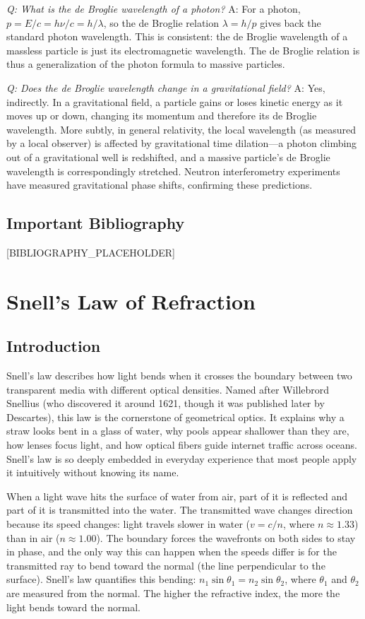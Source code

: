 \documentclass[11pt,openright]{book}
\begin{document}
\textit{Q: What is the de Broglie wavelength of a photon?}
A: For a photon, $p = E/c = h\nu/c = h/\lambda$, so the de Broglie relation $\lambda = h/p$ gives back the standard photon wavelength. This is consistent: the de Broglie wavelength of a massless particle is just its electromagnetic wavelength. The de Broglie relation is thus a generalization of the photon formula to massive particles.

\textit{Q: Does the de Broglie wavelength change in a gravitational field?}
A: Yes, indirectly. In a gravitational field, a particle gains or loses kinetic energy as it moves up or down, changing its momentum and therefore its de Broglie wavelength. More subtly, in general relativity, the local wavelength (as measured by a local observer) is affected by gravitational time dilation---a photon climbing out of a gravitational well is redshifted, and a massive particle's de Broglie wavelength is correspondingly stretched. Neutron interferometry experiments have measured gravitational phase shifts, confirming these predictions.
\section*{Important Bibliography}

[BIBLIOGRAPHY_PLACEHOLDER]


\chapter{Snell's Law of Refraction}

\section*{Introduction}

Snell's law describes how light bends when it crosses the boundary between two transparent media with different optical densities. Named after Willebrord Snellius (who discovered it around 1621, though it was published later by Descartes), this law is the cornerstone of geometrical optics. It explains why a straw looks bent in a glass of water, why pools appear shallower than they are, how lenses focus light, and how optical fibers guide internet traffic across oceans. Snell's law is so deeply embedded in everyday experience that most people apply it intuitively without knowing its name.

When a light wave hits the surface of water from air, part of it is reflected and part of it is transmitted into the water. The transmitted wave changes direction because its speed changes: light travels slower in water ($v = c/n$, where $n \approx 1.33$) than in air ($n \approx 1.00$). The boundary forces the wavefronts on both sides to stay in phase, and the only way this can happen when the speeds differ is for the transmitted ray to bend toward the normal (the line perpendicular to the surface). Snell's law quantifies this bending: $n_1\sin\theta_1 = n_2\sin\theta_2$, where $\theta_1$ and $\theta_2$ are measured from the normal. The higher the refractive index, the more the light bends toward the normal.
\end{document}
